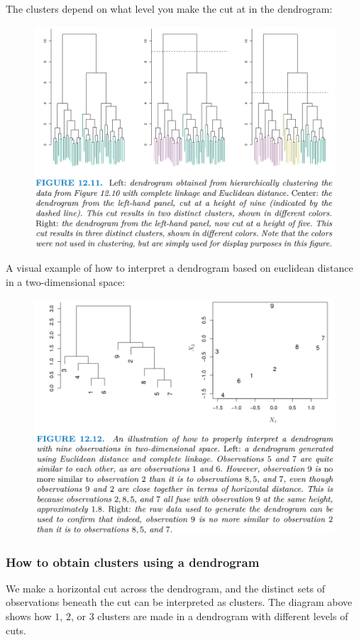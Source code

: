 \documentclass[11pt]{article}
\begin{document}
\noindent The clusters depend on what level you make the cut at in the dendrogram:
\begin{figure}[H]
    \centering
    \includegraphics[width=0.7\linewidth]{Hierarchical clustering - dendrogram initial example.png}
\end{figure}

\noindent A visual example of how to interpret a dendrogram based on euclidean distance in a two-dimensional space:
\begin{figure}[H]
    \centering
    \includegraphics[width=0.7\linewidth]{Hierarchical clustering - dendrogram visual example.png}
\end{figure}

\subsubsection*{How to obtain clusters using a dendrogram}
\noindent We make a horizontal cut across the dendrogram, and the distinct sets of observations beneath the cut can be interpreted as clusters. The diagram above shows how $1$, $2$, or $3$ clusters are made in a dendrogram with different levels of cuts.
\end{document}
